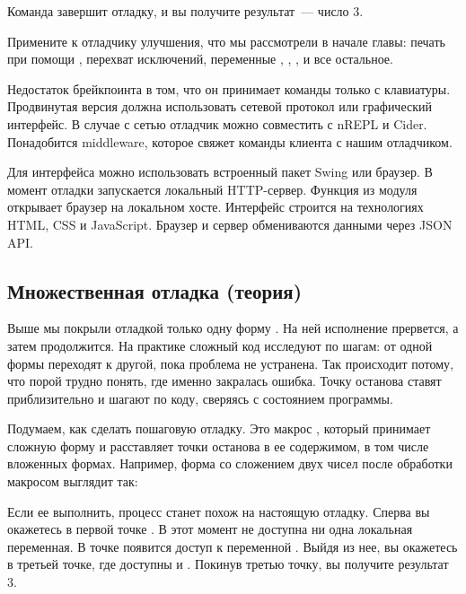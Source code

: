 Команда  завершит отладку, и вы получите результат~--- число 3.

Примените к отладчику улучшения, что мы рассмотрели в начале главы: печать при помощи , перехват исключений, переменные , , ,  и все остальное.

Недостаток брейкпоинта в том, что он принимает команды только с клавиатуры. Продвинутая версия должна использовать сетевой протокол или графический интерфейс. В случае с сетью отладчик можно совместить с nREPL и Cider. Понадобится middleware, которое свяжет команды клиента с нашим отладчиком.

Для интерфейса можно использовать встроенный пакет Swing или браузер. В момент отладки запускается локальный HTTP-сервер. Функция  из модуля  открывает браузер на локальном хосте. Интерфейс строится на технологиях HTML, CSS и JavaScript. Браузер и сервер обмениваются данными через JSON API.

\subsection{Множественная отладка (теория)}

Выше мы покрыли отладкой только одну форму . На ней исполнение прервется, а затем продолжится. На практике сложный код исследуют по шагам: от одной формы переходят к другой, пока проблема не устранена. Так происходит потому, что порой трудно понять, где именно закралась ошибка. Точку останова ставят приблизительно и шагают по коду, сверяясь с состоянием программы.

Подумаем, как сделать пошаговую отладку. Это макрос , который принимает сложную форму и расставляет точки останова в ее содержимом, в том числе вложенных формах. Например, форма  со сложением двух чисел после обработки макросом выглядит так:

\begin{english}
\end{english}

Если ее выполнить, процесс станет похож на настоящую отладку. Сперва вы окажетесь в первой точке . В этот момент не доступна ни одна локальная переменная. В точке  появится доступ к переменной . Выйдя из нее, вы окажетесь в третьей точке, где доступны  и . Покинув третью точку, вы получите результат 3.

